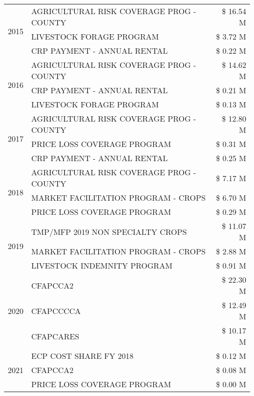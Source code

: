 \begin{tabular}{llr}
\multirow[t]{3}{*}{2015} & AGRICULTURAL RISK COVERAGE PROG - COUNTY & \$ 16.54 M \\
 & LIVESTOCK FORAGE PROGRAM & \$ 3.72 M \\
 & CRP PAYMENT - ANNUAL RENTAL & \$ 0.22 M \\
\cline{1-3}
\multirow[t]{3}{*}{2016} & AGRICULTURAL RISK COVERAGE PROG - COUNTY & \$ 14.62 M \\
 & CRP PAYMENT - ANNUAL RENTAL & \$ 0.21 M \\
 & LIVESTOCK FORAGE PROGRAM & \$ 0.13 M \\
\cline{1-3}
\multirow[t]{3}{*}{2017} & AGRICULTURAL RISK COVERAGE PROG - COUNTY & \$ 12.80 M \\
 & PRICE LOSS COVERAGE PROGRAM & \$ 0.31 M \\
 & CRP PAYMENT - ANNUAL RENTAL & \$ 0.25 M \\
\cline{1-3}
\multirow[t]{3}{*}{2018} & AGRICULTURAL RISK COVERAGE PROG - COUNTY & \$ 7.17 M \\
 & MARKET FACILITATION PROGRAM - CROPS & \$ 6.70 M \\
 & PRICE LOSS COVERAGE PROGRAM & \$ 0.29 M \\
\cline{1-3}
\multirow[t]{3}{*}{2019} & TMP/MFP 2019 NON SPECIALTY CROPS & \$ 11.07 M \\
 & MARKET FACILITATION PROGRAM - CROPS & \$ 2.88 M \\
 & LIVESTOCK INDEMNITY PROGRAM & \$ 0.91 M \\
\cline{1-3}
\multirow[t]{3}{*}{2020} & CFAPCCA2 & \$ 22.30 M \\
 & CFAPCCCCA & \$ 12.49 M \\
 & CFAPCARES & \$ 10.17 M \\
\cline{1-3}
\multirow[t]{3}{*}{2021} & ECP COST SHARE FY 2018 & \$ 0.12 M \\
 & CFAPCCA2 & \$ 0.08 M \\
 & PRICE LOSS COVERAGE PROGRAM & \$ 0.00 M \\
\cline{1-3}
\bottomrule
\end{tabular}

